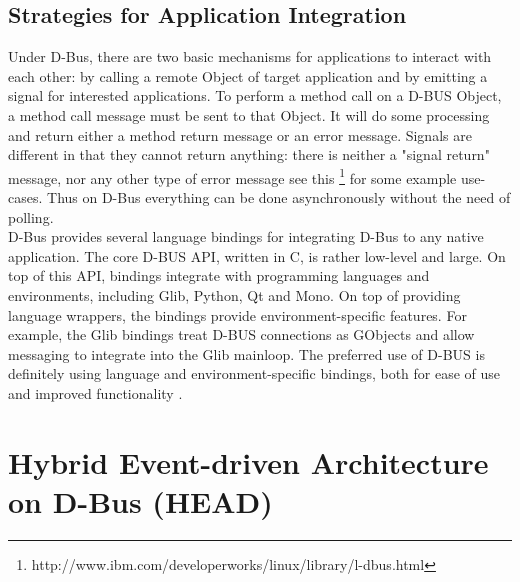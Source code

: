 \documentclass{ifacconf}
\begin{document}
\subsection{Strategies for Application Integration}
Under D-Bus, there are two basic mechanisms for applications to interact with each other: by calling a remote Object of target application and by emitting a signal for interested applications. To perform a method call on a D-BUS Object, a method call message must be sent to that Object. It will do some processing and return either a method return message or an error message. Signals are different in that they cannot return anything: there is neither a "signal return" message, nor any other type of error message see this \footnote{http://www.ibm.com/developerworks/linux/library/l-dbus.html} for some example use-cases. Thus on D-Bus everything can be done asynchronously without the need of polling.\\ 
D-Bus provides several language bindings for integrating D-Bus to any native application. The core D-BUS API, written in C, is rather low-level and large. On top of this API, bindings integrate with programming languages and environments, including Glib, Python, Qt and Mono. On top of providing language wrappers, the bindings provide environment-specific features. For example, the Glib bindings treat D-BUS connections as GObjects and allow messaging to integrate into the Glib mainloop. The preferred use of D-BUS is definitely using language and environment-specific bindings, both for ease of use and improved functionality \cite{Love2005}.
\section{Hybrid Event-driven Architecture on D-Bus (HEAD)}
\label{sec:head}
\end{document}
